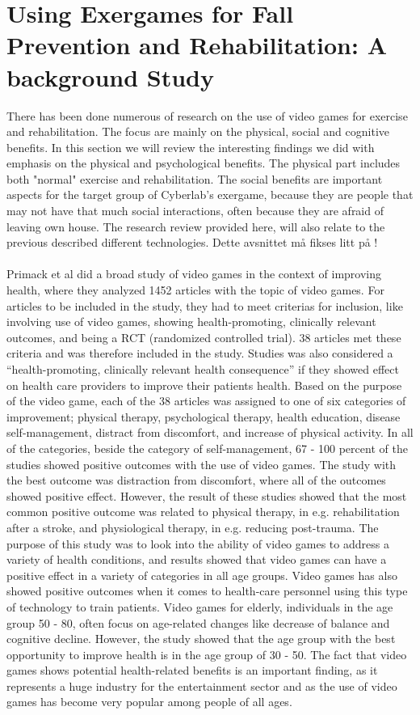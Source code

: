 \section{Using Exergames for Fall Prevention and Rehabilitation: A background Study}
There has been done numerous of research on the use of video games for exercise and rehabilitation. The focus are mainly on the physical, social and cognitive benefits. In this section we will review the interesting findings we did with emphasis on the physical and psychological benefits. The physical part includes both "normal" exercise and rehabilitation. The social benefits are important aspects for the target group of Cyberlab's exergame, because they are people that may not have that much social interactions, often because they are afraid of leaving own house. The research review provided here, will also relate to the previous described different technologies. Dette avsnittet må fikses litt på ! \\ \\
Primack et al did a broad study of video games in the context of improving health, where they analyzed 1452 articles with the topic of video games.  For articles to be included in the study, they had to meet criterias for inclusion, like involving use of video games, showing health-promoting, clinically relevant outcomes, and being a RCT (randomized controlled trial). 38 articles met these criteria and was therefore included in the study. Studies was also considered a “health-promoting, clinically relevant health consequence” if they showed effect on health care providers to improve their patients health. Based on the purpose of the video game, each of the 38 articles was assigned to one of six categories of improvement; physical therapy, psychological therapy, health education, disease self-management, distract from discomfort, and increase of physical activity. In all of the categories, beside the category of self-management, 67 - 100 percent of the studies showed positive outcomes with the use of video games. The study with the best outcome was distraction from discomfort, where all of the outcomes showed positive effect. However, the result of these studies showed that the most common positive outcome was related to physical therapy, in e.g. rehabilitation after a stroke, and physiological therapy, in e.g. reducing post-trauma. The purpose of this study was to look into the ability of video games to address a variety of health conditions, and results showed that video games can have a positive effect in a variety of categories in all age groups. Video games has also showed positive outcomes when it comes to health-care personnel using this type of technology to train patients. Video games for elderly, individuals in the age group 50 - 80, often focus on age-related changes like decrease of balance and cognitive decline. However, the study showed that the age group with the best opportunity to improve health is in the age group of 30 - 50. The fact that video games shows potential health-related benefits is an important finding, as it represents a huge industry for the entertainment sector and as the use of video games has become very popular among people of all ages. \cite{roleofvideogames} \\ \\
